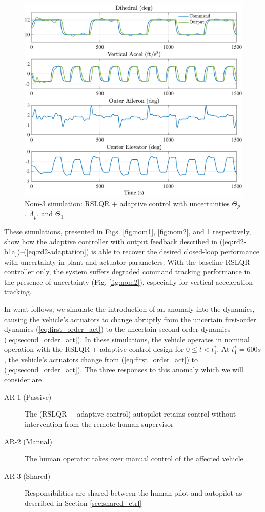 \documentclass[english]{ifacconf}
\begin{document}
\begin{figure}[htbp]
	\centering
	\includegraphics[width=\columnwidth]{../fig/nom3.pdf}
	\caption{Nom-3 simulation: RSLQR + adaptive control with uncertainties $\Theta_p$, $\Lambda_p$, and $\Theta_1$}
	\label{fig:nom3}
\end{figure}

These simulations, presented in Figs. \ref{fig:nom1}, \ref{fig:nom2}, and \ref{fig:nom3} respectively, show how the adaptive controller with output feedback described in (\ref{eq:rd2-b1a})--(\ref{eq:rd2-adaptation}) is able to recover the desired closed-loop performance with uncertainty in plant and actuator parameters. With the baseline RSLQR controller only, the system suffers degraded command tracking performance in the presence of uncertainty (Fig. \ref{fig:nom2}), especially for vertical acceleration tracking.

In what follows, we simulate the introduction of an anomaly into the dynamics, causing the vehicle's actuators to change abruptly from the uncertain first-order dynamics (\ref{eq:first_order_act}) to the uncertain second-order dynamics (\ref{eq:second_order_act}). In these simulations, the vehicle operates in nominal operation with the RSLQR + adaptive control design for $0 \leq t < t_1^*$. At $t_1^* = 600 s$, the vehicle's actuators change from (\ref{eq:first_order_act}) to (\ref{eq:second_order_act}). The three responses to this anomaly which we will consider are
\begin{description}
	\item[AR-1 (Passive)] The (RSLQR + adaptive control) autopilot retains control without intervention from the remote human supervisor
	\item[AR-2 (Manual)] The human operator takes over manual control of the affected vehicle
	\item[AR-3 (Shared)] Responsibilities are shared between the human pilot and autopilot as described in Section \ref{sec:shared_ctrl}
\end{description}
\end{document}

